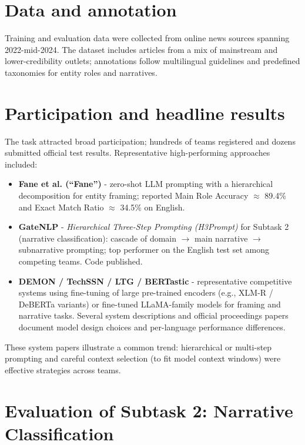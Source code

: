 \section{Data and annotation}
Training and evaluation data were collected from online news sources spanning 2022-mid-2024. The dataset includes articles from a mix of mainstream and lower-credibility outlets; annotations follow multilingual guidelines and predefined taxonomies for entity roles and narratives. \cite{propaganda_site2025}

\section{Participation and headline results}
The task attracted broad participation; hundreds of teams registered and dozens submitted official test results. Representative high-performing approaches included:
\begin{itemize}
  \item \textbf{Fane et al. (``Fane'')} - zero-shot LLM prompting with a hierarchical decomposition for entity framing; reported Main Role Accuracy $\approx$ 89.4\% and Exact Match Ratio $\approx$ 34.5\% on English. \cite{Fane2025}
  \item \textbf{GateNLP} - \emph{Hierarchical Three-Step Prompting (H3Prompt)} for Subtask 2 (narrative classification): cascade of domain $\rightarrow$ main narrative $\rightarrow$ subnarrative prompting; top performer on the English test set among competing teams. Code published. \cite{Singh2025}
  \item \textbf{DEMON / TechSSN / LTG / BERTastic} - representative competitive systems using fine-tuning of large pre-trained encoders (e.g., XLM-R / DeBERTa variants) or fine-tuned LLaMA-family models for framing and narrative tasks. Several system descriptions and official proceedings papers document model design choices and per-language performance differences. \cite{Fenu2025, Premnath2025, Ronningstad2025, Nakov2025}
\end{itemize}
These system papers illustrate a common trend: hierarchical or multi-step prompting and careful context selection (to fit model context windows) were effective strategies across teams. \cite{Fane2025, Singh2025, Ronningstad2025}

\section{Evaluation of Subtask 2: Narrative Classification}
\label{subsec:evaluation-subtask2}

